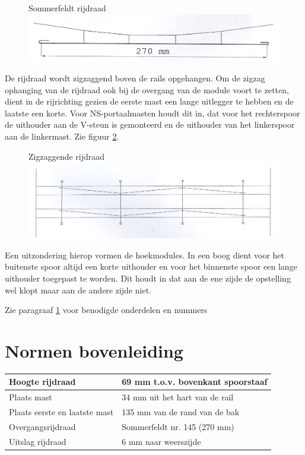\documentclass[12pt,a4paper]{report}
\begin{document}
\begin{figure}[ht]
  \captionbox
  {Sommerfeldt rijdraad\label{figuur9}}
  {\includegraphics[scale=1.0]{images/rcu_figuur9}}
\end{figure}

De rijdraad wordt zigzaggend boven de rails opgehangen. Om de zigzag ophanging van de rijdraad ook bij de overgang van de module voort te zetten, dient in de rijrichting gezien de eerste mast een lange uitlegger te hebben en de laatste een korte. Voor NS-portaalmasten houdt dit in, dat voor het rechterspoor de uithouder aan de V-steun is gemonteerd en de uithouder van het linkerspoor aan de linkermast. Zie figuur \ref{figuur10}.

\begin{figure}[ht]
  \captionbox
  {Zigzaggende rijdraad\label{figuur10}}
  {\includegraphics[scale=1.0]{images/rcu_figuur10}}
\end{figure}

Een uitzondering hierop vormen de hoekmodules. In een boog dient voor het buitenste spoor altijd een korte uithouder en voor het binnenste spoor een lange uithouder toegepast te worden. Dit houdt in dat aan de ene zijde de opstelling wel klopt maar aan de andere zijde niet.

Zie paragraaf \ref{ch:bovenleiding} voor benodigde onderdelen en nummers

\section{Normen bovenleiding}
\label{ch:bovenleiding}

\begin{tabular}{| l | l |}
\hline
\cellcolor[gray]{0.84}Hoogte rijdraad&69 mm t.o.v. bovenkant spoorstaaf\\
\hline
\cellcolor[gray]{0.84}Plaats mast&34 mm uit het hart van de rail\\
\hline
\cellcolor[gray]{0.84}Plaats eerste en laatste mast&135 mm van de rand van de bak\\
\hline
\cellcolor[gray]{0.84}Overgangsrijdraad&Sommerfeldt nr. 145 (270 mm)\\
\hline
\cellcolor[gray]{0.84}Uitslag rijdraad&6 mm naar weerszijde\\
\hline
\end{tabular}
\\
\end{document}
